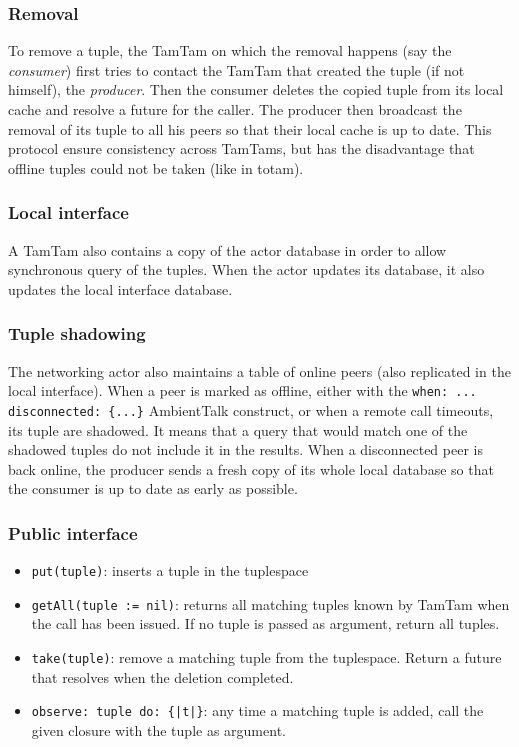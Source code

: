 \documentclass[a4paper,12pt]{article}
\begin{document}
\subsubsection{Removal}
To remove a tuple, the TamTam on which the removal happens (say the \textit{consumer}) first tries to contact the TamTam that created the tuple (if not himself), the \textit{producer}. Then the consumer deletes the copied tuple from its local cache and resolve a future for the caller. The producer then broadcast the removal of its tuple to all his peers so that their local cache is up to date. This protocol ensure consistency across TamTams, but has the disadvantage that offline tuples could not be taken (like in totam).

\subsubsection{Local interface}
A TamTam also contains a copy of the actor database in order to allow synchronous query of the tuples. When the actor updates its database, it also updates the local interface database.

\subsubsection{Tuple shadowing}
The networking actor also maintains a table of online peers (also replicated in the local interface). When a peer is marked as offline, either with the \texttt{when: ... disconnected: \{...\}} AmbientTalk construct, or when a remote call timeouts, its tuple are shadowed. It means that a query that would match one of the shadowed tuples do not include it in the results. When a disconnected peer is back online, the producer sends a fresh copy of its whole local database so that the consumer is up to date as early as possible.

\subsubsection{Public interface}
\begin{itemize}
  \item \texttt{put(tuple)}: inserts a tuple in the tuplespace
  \item \texttt{getAll(tuple := nil)}: returns all matching tuples known by TamTam when the call has been issued. If no tuple is passed as argument, return all tuples.
  \item \texttt{take(tuple)}: remove a matching tuple from the tuplespace. Return a future that resolves when the deletion completed.
  \item \texttt{observe: tuple do: \{|t|\}}: any time a matching tuple is added, call the given closure with the tuple as argument.
\end{itemize}
\end{document}
